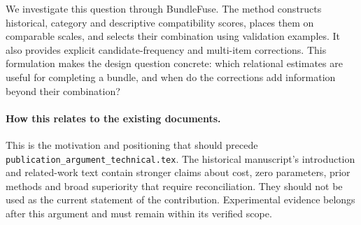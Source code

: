 \documentclass[11pt,a4paper]{article}
\begin{document}
We investigate this question through BundleFuse. The method constructs historical,
category and descriptive compatibility scores, places them on comparable scales,
and selects their combination using validation examples. It also provides explicit
candidate-frequency and multi-item corrections. This formulation makes the design
question concrete: which relational estimates are useful for completing a bundle,
and when do the corrections add information beyond their combination?

\paragraph{How this relates to the existing documents.}
This is the motivation and positioning that should precede
\texttt{publication\_argument\_technical.tex}. The historical manuscript's introduction
and related-work text contain stronger claims about cost, zero parameters, prior
methods and broad superiority that require reconciliation. They should not be used
as the current statement of the contribution. Experimental evidence belongs after
this argument and must remain within its verified scope.
\end{document}
